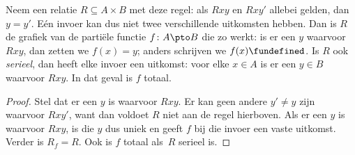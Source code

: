 \documentclass[../../../include/open-logic-section]{subfiles}
\begin{document}
\begin{prop}
Neem een relatie $R \subseteq A \times B$ met deze regel: als $Rxy$ en
$Rxy'$ allebei gelden, dan $y = y'$. Eén invoer kan dus niet twee
verschillende uitkomsten hebben. Dan is $R$ de grafiek van de partiële
functie $f\colon A \pto B$ die zo werkt: is er een $y$ waarvoor $Rxy$,
dan zetten we $f(x) = y$; anders schrijven we $f(x) \fundefined$. Is
$R$ ook \emph{serieel}, dan heeft elke invoer een uitkomst: voor elke
$x \in A$ is er een $y \in B$ waarvoor $Rxy$. In dat geval is $f$
totaal.
\end{prop}

\begin{proof}
Stel dat er een $y$ is waarvoor $Rxy$. Er kan geen andere $y' \neq y$
zijn waarvoor $Rxy'$, want dan voldoet $R$ niet aan de regel hierboven.
Als er een $y$ is waarvoor $Rxy$, is die $y$ dus uniek en geeft $f$ bij
die invoer een vaste uitkomst. Verder is $R_f = R$. Ook is $f$ totaal
als~$R$ serieel is.
\end{proof}
\end{document}
